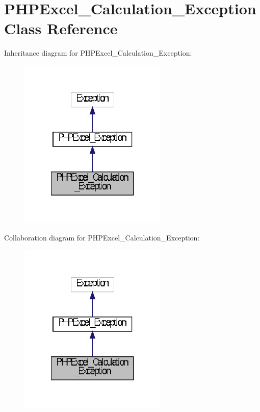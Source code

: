 \section{P\+H\+P\+Excel\+\_\+\+Calculation\+\_\+\+Exception Class Reference}
\label{class_p_h_p_excel___calculation___exception}


Inheritance diagram for P\+H\+P\+Excel\+\_\+\+Calculation\+\_\+\+Exception\+:\nopagebreak
\begin{figure}[H]
\begin{center}
\leavevmode
\includegraphics[width=200pt]{class_p_h_p_excel___calculation___exception__inherit__graph}
\end{center}
\end{figure}


Collaboration diagram for P\+H\+P\+Excel\+\_\+\+Calculation\+\_\+\+Exception\+:\nopagebreak
\begin{figure}[H]
\begin{center}
\leavevmode
\includegraphics[width=200pt]{class_p_h_p_excel___calculation___exception__coll__graph}
\end{center}
\end{figure}
